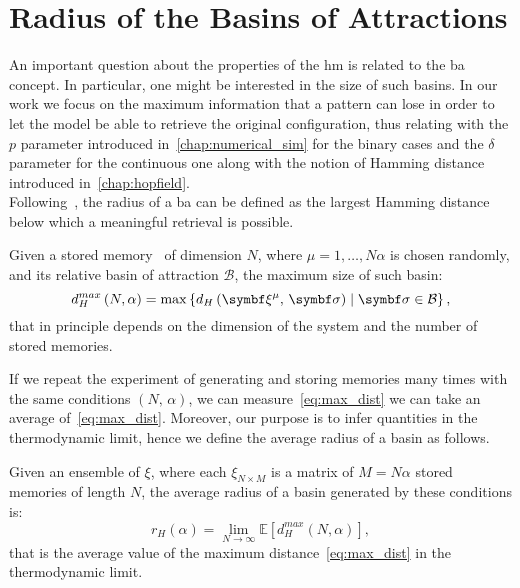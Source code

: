\documentclass[\rootdir/main.tex]{subfiles}
\begin{document}
\chapter{Radius of the Basins of Attractions}\label{chap:radius}
An important question about the properties of the \acrlong{hm} is related to the \acrlong{ba} concept. In particular, one might be interested in the size of such basins. In our work we focus on the maximum information that a pattern can lose in order to let the model be able to retrieve the original configuration, thus relating with the $p$ parameter introduced in~\cref{chap:numerical_sim} for the binary cases and the $\delta$ parameter for the continuous one along with the notion of Hamming distance introduced in~\cref{chap:hopfield}.\\
Following~\cite{Kanter}, the radius of a \acrlong{ba} can be defined as the largest Hamming distance below which a meaningful retrieval is possible.
\begin{definition}
    Given a stored memory \bxi\ of dimension $N$, where $\mu = 1, \dots, N \alpha$ is chosen randomly, and its relative basin of attraction $\mathcal{B}$, the maximum size of such basin:
    \begin{equation}\label{eq:max_dist}
        d_H^{max} \left( N, \alpha \right) = \max \left\{ d_H\left( \bxi, \, \bsigma \right) \mid \bsigma \in \mathcal{B} \right\},
    \end{equation}
that in principle depends on the dimension of the system and the number of stored memories.
\end{definition}
If we repeat the experiment of generating and storing memories many times with the same conditions $(N, \, \alpha)$, we can measure~\cref{eq:max_dist} we can take an average of~\cref{eq:max_dist}. Moreover, our purpose is to infer quantities in the thermodynamic limit, hence we define the average radius of a basin as follows.
\begin{definition}
    Given an ensemble of $\xi$, where each $\xi_{N \times M}$ is a matrix of $M = N \alpha$ stored memories of length $N$, the average radius of a basin generated by these conditions is:
    \begin{equation}\label{eq:average_radius}
        r_H\left( \alpha \right) = \lim_{N \to \infty} \mathbb{E}\left[ d_H^{max}(N, \alpha) \right],
    \end{equation}
that is the average value of the maximum distance~\cref{eq:max_dist} in the thermodynamic limit.
\end{definition}
\end{document}
